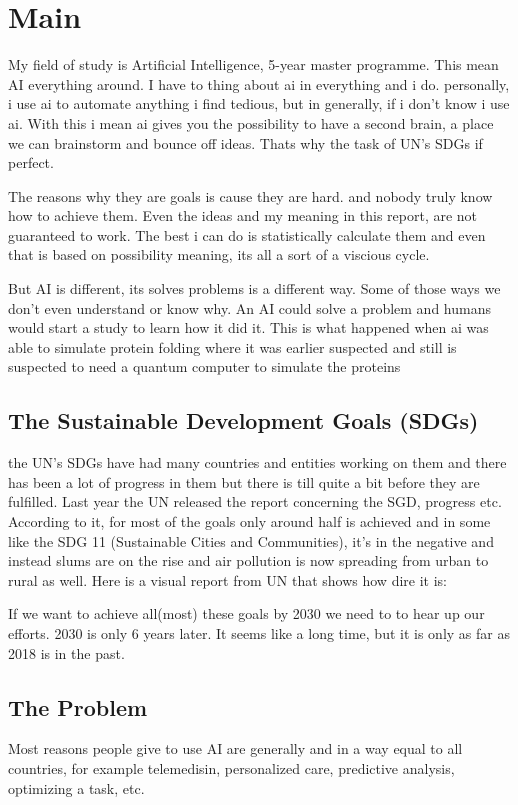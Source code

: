 \chapter{Main}
My field of study is Artificial Intelligence, 5-year master programme. This mean AI everything around. I have to thing about ai in everything and i do. personally, i use ai to automate anything i find tedious, but in generally, if i don't know i use ai. With this i mean ai gives you the possibility to have a second brain, a place we can brainstorm and bounce off ideas. Thats why the task of UN's SDGs if perfect. 

The reasons why they are goals is cause they are hard. and nobody truly know how to achieve them. Even the ideas and my meaning in this report, are not guaranteed to work. The best i can do is statistically calculate them and even that is based on possibility meaning, its all a sort of a viscious cycle.

But AI is different, its solves problems is a different way. Some of those ways we don't even understand or know why. An AI could solve a problem and humans would start a study to learn how it did it. This is what happened when ai was able to simulate protein folding\cite{protein-folding} where it was earlier suspected and still is suspected to need a  quantum computer to simulate the proteins\cite{Hu2023Quantum}

\section{The Sustainable Development Goals (SDGs)}
the UN's SDGs have had many countries and entities working on them and there has been a lot of progress in them but there is till quite a bit before they are fulfilled. 
Last year the UN released the report concerning the SGD, progress etc\cite{sgds-progress}. According to it, for most of the goals only around half is achieved and in some like the SDG 11 (Sustainable Cities and Communities), it's in the negative and instead slums are on the rise and air pollution is now spreading from urban to rural as well. Here is a visual report from UN that shows how dire it is: \cite{sgds-progress}

If we want to achieve all(most) these goals by 2030 we need to to hear up our efforts. 2030 is only 6 years later. It seems like a long time, but it is only as far as 2018 is in the past.

\section{The Problem}
Most reasons people give to use AI are generally and in a way equal to all countries, for example telemedisin, personalized care, predictive analysis, optimizing a task, etc.

